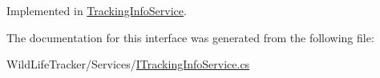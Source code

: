 Implemented in \hyperlink{classWildLifeTracker_1_1Services_1_1TrackingInfoService_af4b4cf67d3e3a8ec3e01041262c8f13a}{Tracking\+Info\+Service}.



The documentation for this interface was generated from the following file\+:\begin{DoxyCompactItemize}
\item 
Wild\+Life\+Tracker/\+Services/\hyperlink{ITrackingInfoService_8cs}{I\+Tracking\+Info\+Service.\+cs}\end{DoxyCompactItemize}
